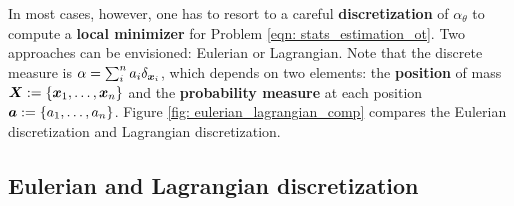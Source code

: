 \documentclass[11pt]{article}
\begin{document}
In most cases, however, one has to resort to a careful \textbf{discretization} of $\alpha_{\theta}$ to compute a \textbf{local minimizer} for Problem \eqref{eqn: stats_estimation_ot}. Two approaches can be envisioned: Eulerian or Lagrangian. Note that the discrete measure is $\alpha = \sum_{i}^{n}a_{i}\delta_{\boldsymbol{x}_{i}}$, which depends on two elements: the \textbf{position} of mass $\boldsymbol{X} := \{\boldsymbol{x}_{1}, \ldots, \boldsymbol{x}_{n}\}$ and the \textbf{probability measure} at each position $\boldsymbol{a}:= \{a_{1},\ldots, a_{n}\}$. Figure \ref{fig: eulerian_lagrangian_comp} compares the Eulerian discretization and Lagrangian discretization. 

\subsection{Eulerian and Lagrangian discretization}
\end{document}
